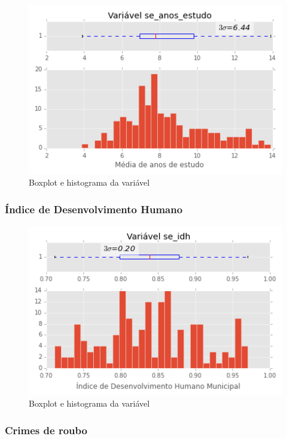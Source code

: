 \begin{figure}[H]
	\centering
	\includegraphics[width=0.8\linewidth]{img/var_se_anos_estudo_boxhist}
	\caption{Boxplot e histograma da variável }
	\label{fig:var_se_anos_estudo_boxhist}
\end{figure} 

\subsubsection{Índice de Desenvolvimento Humano}

\begin{figure}[H]
	\centering
	\includegraphics[width=0.8\linewidth]{img/var_se_idh_boxhist}
	\caption{Boxplot e histograma da variável }
	\label{fig:var_idh_boxhist}
\end{figure} 

\subsubsection{Crimes de roubo}

